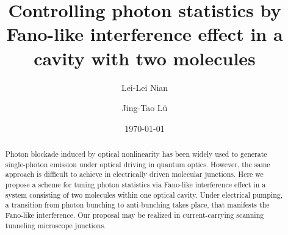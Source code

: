 \documentclass[aps,preprint,floatfix,footinbib,longbibliography]{revtex4-1}
\newcommand{\revision}[1]{{\color{blue}{#1}}}
\newcommand{\JT}[1]{{\color{red}{#1}}}
\begin{document}


\title{Controlling photon statistics by Fano-like interference effect in a cavity with two molecules}

\author{Lei-Lei Nian}
\author{Jing-Tao L\"{u}}




\date{\today}%
\begin{abstract}
Photon blockade induced by optical nonlinearity has been widely used to generate single-photon emission under optical driving in quantum optics. However, the same approach is difficult to achieve in electrically driven molecular junctions. Here we propose a scheme for tuning photon statistics via Fano-like interference effect in a system consisting of two molecules within one optical cavity.
Under electrical pumping, a transition from photon bunching to anti-bunching takes place, that manifests the Fano-like interference. \revision{Even in presence of the strong dipole-dipole interaction between molecules, a strong photon anti-bunching can be achieved based on the parameters extracted from experiments.}
Our proposal may be realized in current-carrying scanning tunneling microscope junctions.


\end{abstract}

\maketitle

\end{document}

